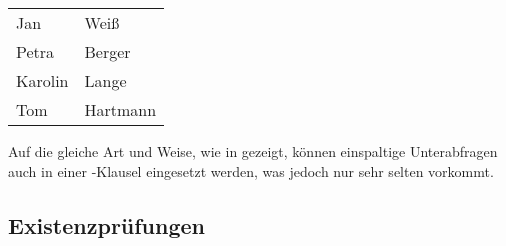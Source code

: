         \begin{center}
          \begin{small}
            \tablehead{}
            \begin{msoraclesql}
              \begin{supertabular}{ll}
									Jan & Weiß \\
									Petra & Berger \\
									Karolin & Lange \\
									Tom & Hartmann \\
								\end{supertabular}
            \end{msoraclesql}
          \end{small}
        \end{center}
        Auf die gleiche Art und Weise, wie in  gezeigt, können einspaltige Unterabfragen auch in einer \HAVING-Klausel eingesetzt werden, was jedoch nur sehr selten vorkommt.
      \subsection{Existenzprüfungen}
